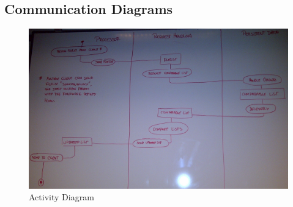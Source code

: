\subsection{Communication Diagrams}
\begin{figure}[h!]
  \includegraphics[width=\textwidth,natwidth=2456,natheight=1522]{illustrations/ActivityDiagram.jpg}
  \caption{Activity Diagram}
\end{figure}
\newpage